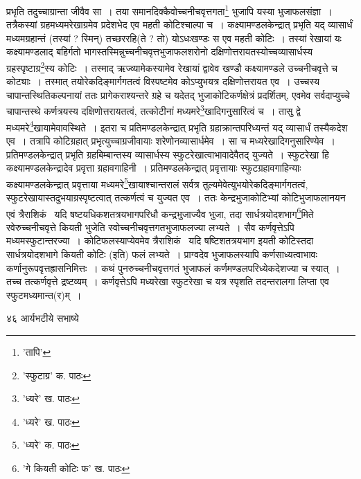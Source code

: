\documentclass[11pt, openany]{book}
\begin{document}
{{{{{\vspace{0.3cm}
\noindent प्रभृति तदुच्चाग्रान्ता जीवैव सा~। तया समानदिक्कैवोच्चनीचवृत्तगता\renewcommand{\thefootnote}{१}\footnote{'तापि'} भुजापि यस्या भुजाफलसंज्ञा~। तत्रैकस्यां ग्रहमध्यमरेखाग्रमेव प्रदेशभेद एव महती कोटिश्चाल्पा च~। कक्ष्यामण्डलकेन्द्रात् प्रभृति यद् व्यासार्धं मध्यमग्रहान्तं (तस्यां ? स्मिन्) तच्छररहि(ते ? तो) योऽधःखण्डः स एव महती कोटिः~। तस्यां रेखायां यः कक्ष्यामण्डलाद् बहिर्गतो भागस्तस्मिन्नुच्चनीचवृत्तभुजाफलशरोनो दक्षिणोत्तरायतस्योच्चव्यासार्धस्य ग्रहस्पृष्टाग्र\renewcommand{\thefootnote}{२}\footnote{'स्फुटाग्र' क. पाठः}स्य कोटिः~। तस्माद् ऋज्व्यामेकस्यामेव रेखायां द्वावेव खण्डौ कक्ष्यामण्डले उच्चनीचवृत्ते च कोट्याः~। तस्मात् तयोरेकदिङ्मार्गगतत्वं विस्पष्टमेव
कोऽप्युभयत्र दक्षिणोत्तरायत एव~। उच्चस्य चापान्तस्थितिकल्पनायां ततः प्रागेकराश्यन्तरे ग्रहे च यदेतद् भुजाकोटिकर्णक्षेत्रं प्रदर्शितम्, एवमेव सर्वदाप्युच्चे चापान्तस्थे कर्णत्रयस्य दक्षिणोत्तरायतत्वं, तत्कोटीनां मध्यमरे\renewcommand{\thefootnote}{३}\footnote{'ध्यरे' ख. पाठः}खादिगनुसारित्वं च~। तासु द्वे मध्यमरे\renewcommand{\thefootnote}{४}\footnote{'ध्यरे' ख. पाठः}खायामेवावस्थिते~। इतरा च प्रतिमण्डलकेन्द्रात्
प्रभृति ग्रहाक्रान्तपरिध्यन्तं यद् व्यासार्धं तस्यैकदेश एव~। तत्रापि कोटिग्रहात् प्रभृत्युच्चाग्रजीवायाः शरेणोनव्यासार्धमेव~। सा च मध्यरेखादिगनुसारिण्येव~। प्रतिमण्डलकेन्द्रात् प्रभृति ग्रहबिम्बान्तस्य व्यासार्धस्य स्फुटरेखात्वाभावादेवैतद् युज्यते~। स्फुटरेखा हि कक्ष्यामण्डलकेन्द्रादेव प्रवृत्ता ग्रहावगाहिनी~। प्रतिमण्डलकेन्द्रात् प्रवृत्तायाः स्फुटग्रहावगाहिन्याः कक्ष्यामण्डलकेन्द्रात् प्रवृत्ताया मध्यमरे\renewcommand{\thefootnote}{५}\footnote{'ध्यरे' क. पाठः}खायाश्चान्तरालं सर्वत्र
तुल्यमेवेत्युभयोरेकदिङ्मार्गगतत्वं, स्फुटरेखायास्तदुभयाग्रस्पृष्टत्वात् तत्कर्णत्वं च युज्यत एव~। ततः केन्द्रभुजाकोटिभ्यां कोटिभुजाफलानयन एवं त्रैराशिकं \textendash\ यदि षष्टयधिकशतत्रयभागपरिधौ कन्द्रभुजाज्यैव भुजा, तदा सार्धत्रयोदशभाग\renewcommand{\thefootnote}{६}\footnote{'गे कियती कोटिः फ' ख. पाठः}मिते रवेरुच्चनीचवृत्ते कियती भुजेति स्वोच्चनीचवृत्तगतभुजाफलज्या लभ्यते~। सैव कर्णवृत्तेऽपि मध्यमस्फुटान्तरज्या~। कोटिफलस्याप्येवमेव त्रैराशिकं  \textendash\ यदि
षष्टिशतत्रयभाग इयती कोटिस्तदा सार्धत्रयोदशभागे कियती कोटिः (इति) फलं लभ्यते~। प्राग्वदेव भुजाफलस्यापि कर्णसाध्यत्वाभावः कर्णानुरूपवृत्तह्रासनिमित्तः~। कथं पुनरुच्चनीचवृत्तगतं भुजाफलं कर्णमण्डलपरिध्येकदेशज्या च स्यात्~। तच्च तत्कर्णवृत्ते द्रष्टव्यम्~। कर्णवृत्तेऽपि
मध्यरेखा स्फुटरेखा च यत्र स्पृशति तदन्तरालगा लिप्ता एव स्फुटमध्यमान्त(र)म्~। 

\newpage

\vspace{3cm} ४६ \hspace{4cm}आर्यभटीये सभाष्ये

}}}}}
\end{document}
